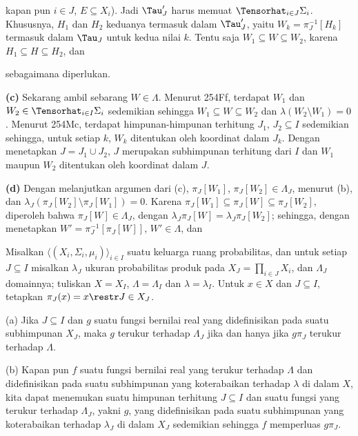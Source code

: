 {

\noindent kapan pun $i\in J$, $E\subseteq X_i$).   Jadi $\Tau'_J$ harus
memuat $\Tensorhat_{i\in J}\Sigma_i$.   Khususnya, $H_1$ dan $H_2$
keduanya termasuk dalam $\Tau'_J$, yaitu $W_k=\pi_J^{-1}[H_k]$ termasuk dalam
$\Tau_J$ untuk kedua nilai $k$.   Tentu saja $W_1\subseteq W\subseteq W_2$,
karena $H_1\subseteq H\subseteq H_2$, dan

\noindent sebagaimana diperlukan.

\medskip

{\bf (c)} Sekarang ambil sebarang $W\in\Lambda$.   Menurut
254Ff, terdapat $W_1$ dan $W_2\in\Tensorhat_{i\in I}\Sigma_i$ sedemikian sehingga
$W_1\subseteq W\subseteq W_2$ dan $\lambda(W_2\setminus W_1)=0$.   Menurut
254Mc, terdapat himpunan-himpunan terhitung $J_1$, $J_2\subseteq I$ sedemikian sehingga, untuk
setiap $k$, $W_k$ ditentukan oleh koordinat dalam $J_k$.   Dengan menetapkan
$J=J_1\cup J_2$, $J$ merupakan subhimpunan terhitung dari $I$ dan $W_1$ maupun
$W_2$ ditentukan oleh koordinat dalam $J$.

\medskip

{\bf (d)} Dengan melanjutkan argumen dari (c), $\pi_J[W_1]$,
$\pi_J[W_2]\in\Lambda_J$, menurut (b), dan
$\lambda_J(\pi_J[W_2]\setminus\pi_J[W_1])=0$.   Karena
$\pi_J[W_1]\subseteq\pi_J[W]\subseteq\pi_J[W_2]$, diperoleh bahwa
$\pi_J[W]\in\Lambda_J$, dengan
$\lambda_J\pi_J[W]=\lambda_J\pi_J[W_2]$;  sehingga, dengan menetapkan
$W'=\pi_J^{-1}[\pi_J[W]]$, $W'\in\Lambda$, dan

}%

 Misalkan
$\langle(X_i,\Sigma_i,\mu_i)\rangle_{i\in I}$
suatu keluarga ruang probabilitas, dan untuk setiap $J\subseteq I$ misalkan
$\lambda_J$ ukuran probabilitas produk pada
$X_J=\prod_{i\in J}X_i$, dan $\Lambda_J$ domainnya;  tuliskan $X=X_I$,
$\Lambda=\Lambda_I$ dan $\lambda=\lambda_I$.   Untuk $x\in X$ dan
$J\subseteq I$, tetapkan $\pi_J(x)=x\restr J\in X_J$.

(a) Jika $J\subseteq I$ dan $g$ suatu fungsi bernilai real yang didefinisikan pada suatu
subhimpunan $X_J$, maka $g$ terukur terhadap $\Lambda_J$ jika dan hanya jika $g\pi_J$
terukur terhadap $\Lambda$.

(b) Kapan pun $f$ suatu fungsi bernilai real yang terukur terhadap $\Lambda$ dan didefinisikan
pada suatu subhimpunan yang koterabaikan terhadap $\lambda$ di dalam $X$, kita dapat menemukan suatu himpunan terhitung
$J\subseteq I$ dan suatu fungsi yang terukur terhadap $\Lambda_J$, yakni $g$, yang didefinisikan pada suatu
subhimpunan yang koterabaikan terhadap $\lambda_J$ di dalam $X_J$ sedemikian sehingga $f$ memperluas $g\pi_J$.

